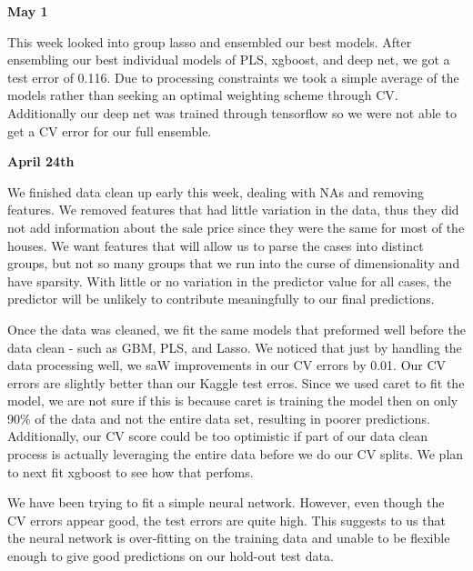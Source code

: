 \documentclass[12pt]{article}
\newcommand{\myfont}{\fontfamily{pcr}\selectfont}
\begin{document}
\textbf{May 1}

This week looked into group lasso and ensembled our best models.  After ensembling our best individual models of PLS, xgboost, and deep net, we got a test error of 0.116.  Due to processing constraints we took a simple average of the models rather than seeking an optimal weighting scheme through CV.  Additionally our deep net was trained through tensorflow so we were not able to get a CV error for our full ensemble.

\textbf{April 24th}

We finished data clean up early this week, dealing with NAs and removing features.  We removed features that had little variation in the data, thus they did not add information about the sale price since they were the same for most of the houses.  We want features that will allow us to parse the cases into distinct groups, but not so many groups that we run into the curse of dimensionality and have sparsity.  With little or no variation in the predictor value for all cases, the predictor will be unlikely to contribute meaningfully to our final predictions.

Once the data was cleaned, we fit the same models that preformed well before the data clean - such as GBM, PLS, and Lasso.  We noticed that just by handling the data processing well, we saW improvements in our CV errors by 0.01.  Our CV errors are slightly better than our Kaggle test erros.  Since we used {\myfont caret} to fit the model, we are not sure if this is because {\myfont caret} is training the model then on only 90\% of the data and not the entire data set, resulting in poorer predictions.  Additionally, our CV score could be too optimistic if part of our data clean process is actually leveraging the entire data before we do our CV splits.  We plan to next fit xgboost to see how that perfoms.

We have been trying to fit a simple neural network.  However, even though the CV errors appear good, the test errors are quite high.  This suggests to us that the neural network is over-fitting on the training data and unable to be flexible enough to give good predictions on our hold-out test data.


\end{document}
